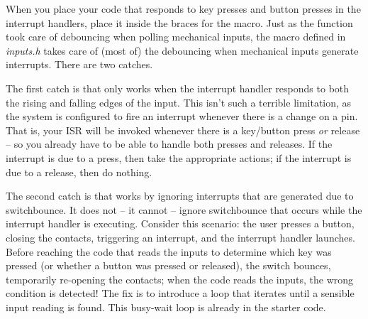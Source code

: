 When you place your code that responds to key presses and button presses in the interrupt handlers, place it inside the braces for the  macro.
Just as the  function took care of debouncing when polling mechanical inputs, the  macro defined in \textit{inputs.h} takes care of (most of) the debouncing when mechanical inputs generate interrupts.
There are two catches.

The first catch is that  only works when the interrupt handler responds to both the rising and falling edges of the input.
This isn't such a terrible limitation, as the system is configured to fire an interrupt whenever there is a change on a pin.
That is, your ISR will be invoked whenever there is a key/button press \textit{or} release --
so you already have to be able to handle both presses and releases.
If the interrupt is due to a press, then take the appropriate actions;
if the interrupt is due to a release, then do nothing.

The second catch is that  works by ignoring interrupts that are generated due to switchbounce.
It does not -- it cannot -- ignore switchbounce that occurs while the interrupt handler is executing.
Consider this scenario: the user presses a button, closing the contacts, triggering an interrupt, and the interrupt handler launches.
Before reaching the code that reads the inputs to determine which key was pressed (or whether a button was pressed or released), the switch bounces, temporarily re-opening the contacts;
when the code reads the inputs, the wrong condition is detected!
The fix is to introduce a loop that iterates until a sensible input reading is found.
This busy-wait loop is already in the starter code.
